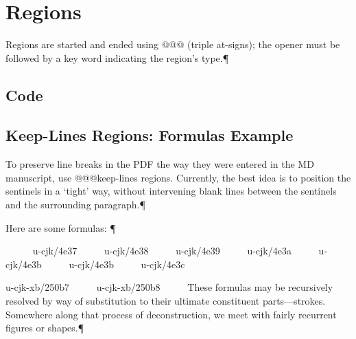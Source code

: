 

\chapter{Regions
}
Regions are started and ended using {\mktsFontfileSourcecodeproregular{}@@@} (triple at-signs); the opener
must be followed by a key word indicating the region’s type.¶\par

\section{Code
}
\section{Keep-Lines Regions: Formulas Example
}
To preserve line breaks in the PDF the way they were entered in
the MD manuscript, use {\mktsFontfileSourcecodeproregular{}@@@keep-lines} regions. Currently, the
best idea is to position the sentinels in a ‘tight’ way, without
intervening blank lines between the sentinels and the surrounding
paragraph.¶\par
Here are some formulas:
¶\par
\begingroup{}     
{\mktsFontfileSourcecodeproregular{}u-cjk/4e37}     
{\mktsFontfileSourcecodeproregular{}u-cjk/4e38}     
{\mktsFontfileSourcecodeproregular{}u-cjk/4e39}     
{\mktsFontfileSourcecodeproregular{}u-cjk/4e3a}     
{\mktsFontfileSourcecodeproregular{}u-cjk/4e3b}     
{\mktsFontfileSourcecodeproregular{}u-cjk/4e3b}     
{\mktsFontfileSourcecodeproregular{}u-cjk/4e3c}     

{\mktsFontfileSourcecodeproregular{}u-cjk-xb/250b7}     
{\mktsFontfileSourcecodeproregular{}u-cjk-xb/250b8}     
\endgroup{}These formulas may be recursively resolved by way of substitution to their
ultimate constituent parts—strokes. Somewhere along that process of
deconstruction, we meet with fairly recurrent figures or shapes.¶\par

